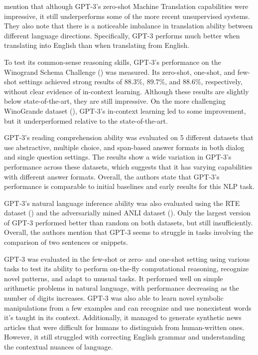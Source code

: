 \documentclass{article}
\begin{document}
\medskip
\noindent
\citet{brown2020gpt3} mention that although GPT-3's zero-shot Machine Translation capabilities were impressive, it still underperforms some of the more recent unsupervised systems. They also note that there is a noticeable imbalance in translation ability between different language directions. Specifically, GPT-3 performs much better when translating into English than when translating from English.

\medskip
\noindent
To test its common-sense reasoning skills, GPT-3's performance on the Winogrand Schema Challenge (\citet{levesque2012winogrand}) was measured. Its zero-shot, one-shot, and few-shot settings achieved strong results of 88.3\%, 89.7\%, and 88.6\%, respectively, without clear evidence of in-context learning. Although these results are slightly below state-of-the-art, they are still impressive. On the more challenging WinoGrande dataset (\citet{winogrande}), GPT-3's in-context learning led to some improvement, but it underperformed relative to the state-of-the-art.

\medskip
\noindent
GPT-3's reading comprehension ability was evaluated on 5 different datasets that use abstractive, multiple choice, and span-based answer formats in both dialog and single question settings. The results show a wide variation in GPT-3's performance across these datasets, which suggests that it has varying capabilities with different answer formats. Overall, the authors state that GPT-3's performance is comparable to initial baselines and early results for this NLP task.

\medskip
\noindent
GPT-3's natural language inference ability was also evaluated using the RTE dataset (\citet{rte1}) and the adversarially mined ANLI dataset (\citet{anli}). Only the largest version of GPT-3 performed better than random on both datasets, but still insufficiently. Overall, the authors mention that GPT-3 seems to struggle in tasks involving the comparison of two sentences or snippets.

\medskip
\noindent
GPT-3 was evaluated in the few-shot or zero- and one-shot setting using various tasks to test its ability to perform on-the-fly computational reasoning, recognize novel patterns, and adapt to unusual tasks. It performed well on simple arithmetic problems in natural language, with performance decreasing as the number of digits increases. GPT-3 was also able to learn novel symbolic manipulations from a few examples and can recognize and use nonexistent words it's taught in its context. Additionally, it managed to generate synthetic news articles that were difficult for humans to distinguish from human-written ones. However, it still struggled with correcting English grammar and understanding the contextual nuances of language. 
\end{document}
